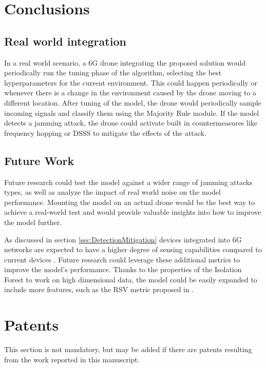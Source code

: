 \documentclass[futureinternet,article,submit,pdftex,moreauthors]{Definitions/mdpi}
\begin{document}
\section{Conclusions}

\subsection{Real world integration}

In a real world scenario, a 6G drone integrating the proposed solution would periodically run the tuning phase of the algorithm, selecting the best hyperparameters for the current environment. This could happen periodically or whenever there is a change in the environment caused by the drone moving to a different location. 
After tuning of the model, the drone would periodically sample incoming signals and classify them using the Majority Rule module. If the model detects a jamming attack, the drone could activate built in countermeasures like frequency hopping or DSSS to mitigate the effects of the attack. 

\subsection{Future Work}

Future research could test the model against a wider range of jamming attacks types, as well as analyze the impact of real world noise on the model performance.
Mounting the model on an actual drone would be the best way to achieve a real-world test and would provide valuable insights into how to improve the model further.

As discussed in section \ref{sec:DetectionMitigation} devices integrated into 6G networks are expected to have a higher degree of sensing capabilities compared to current devices \cite{6GRoadmapLetaief}. Future research could leverage these additional metrics to improve the model's performance. Thanks to the properties of the Isolation Forest to work on high dimensional data, the model could be easily expanded to include more features, such as the RSV metric proposed in \cite{JammingDetectionIoT-Hussain}.


\section{Patents}

This section is not mandatory, but may be added if there are patents resulting from the work reported in this manuscript.
\end{document}
